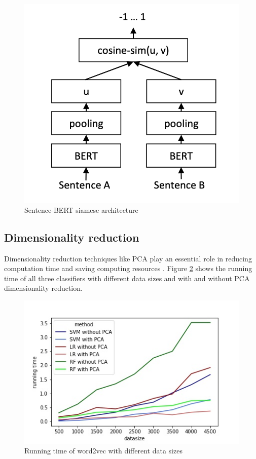 \documentclass[12pt, a4paper, titlepage]{article}
\begin{document}
\begin{figure}[hb!]
  \center
  \includegraphics[scale=0.5]{SBERT.png}
  \caption[Sentence-BERT siamese structure]{\label{fig: F5} Sentence-\ac{BERT} siamese architecture \citep[3]{reimers2019}}
\end{figure}

\subsection{Dimensionality reduction}
Dimensionality reduction techniques like \ac{PCA} play an essential role in reducing computation time and saving computing resources \citep{ayesha2020}. Figure \ref{fig: F6} shows the running time of all three classifiers with different data sizes and with and without \ac{PCA} dimensionality reduction. 


\begin{figure}[hb!]
  \center
  \includegraphics[scale=0.5]{running_time_PCA.jpeg}
  \caption{\label{fig: F6} Running time of word2vec with different data sizes}
\end{figure}
\end{document}
